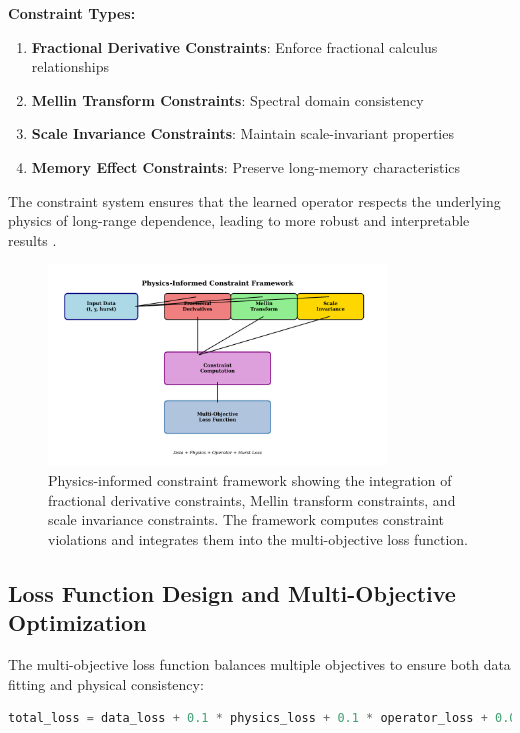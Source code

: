 \textbf{Constraint Types:}
\begin{enumerate}
    \item \textbf{Fractional Derivative Constraints}: Enforce fractional calculus relationships
    \item \textbf{Mellin Transform Constraints}: Spectral domain consistency
    \item \textbf{Scale Invariance Constraints}: Maintain scale-invariant properties
    \item \textbf{Memory Effect Constraints}: Preserve long-memory characteristics
\end{enumerate}

The constraint system ensures that the learned operator respects the underlying physics of long-range dependence, leading to more robust and interpretable results \cite{kantelhardt2002multifractal, torre2007wavelet}.

\begin{figure}[h]
\centering
\includegraphics[width=0.8\textwidth]{physics_constraint_framework.png}
\caption{Physics-informed constraint framework showing the integration of fractional derivative constraints, Mellin transform constraints, and scale invariance constraints. The framework computes constraint violations and integrates them into the multi-objective loss function.}
\label{fig:physics_constraints}
\end{figure}

\subsection{Loss Function Design and Multi-Objective Optimization}

The multi-objective loss function balances multiple objectives to ensure both data fitting and physical consistency:

\begin{lstlisting}[language=Python, caption=Multi-Objective Loss Function]
total_loss = data_loss + 0.1 * physics_loss + 0.1 * operator_loss + 0.05 * hurst_loss
\end{lstlisting}

